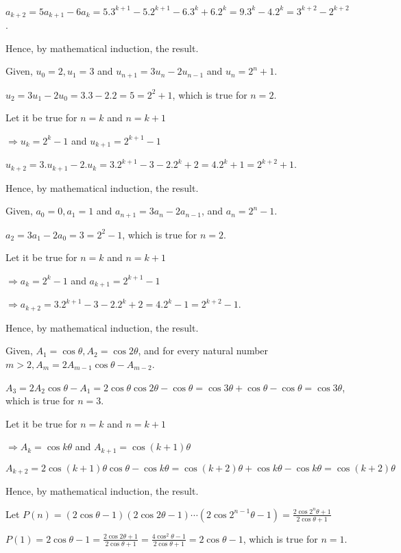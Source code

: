  $a_{k + 2} = 5a_{k + 1} - 6a_k = 5.3^{k + 1} - 5.2^{k + 1} - 6.3^k + 6.2^k = 9.3^k - 4.2^k = 3^{k + 2} -
  2^{k + 2}$.

  Hence, by mathematical induction, the result.
\item Given, $u_0 = 2, u_1 = 3$ and $u_{n + 1} = 3u_n - 2u_{n - 1}$ and $u_n = 2^n + 1$.

  $u_2 = 3u_1 - 2u_0 = 3.3 - 2.2 = 5 = 2^2 + 1$, which is true for $n = 2$.

  Let it be true for $n = k$ and $n = k + 1$

  $\Rightarrow u_k = 2^k - 1$ and $u_{k + 1} = 2^{k + 1} - 1$

  $u_{k + 2} = 3.u_{k + 1} - 2.u_k = 3.2^{k + 1} - 3 - 2.2^k + 2 = 4.2^k + 1 = 2^{k + 2} + 1$.

  Hence, by mathematical induction, the result.
\item Given, $a_0 = 0, a_1 = 1$ and $a_{n + 1} = 3a_n - 2a_{n - 1}$, and $a_n = 2^n - 1$.

  $a_2 = 3a_1 - 2a_0 = 3 = 2^2 - 1$, which is true for $n = 2$.

  Let it be true for $n = k$ and $n = k + 1$

  $\Rightarrow a_k = 2^k - 1$ and $a_{k + 1} = 2^{k + 1} - 1$

  $\Rightarrow a_{k + 2} = 3.2^{k + 1} - 3 - 2.2^k + 2 = 4.2^k - 1 = 2^{k + 2} - 1$.

  Hence, by mathematical induction, the result.
\item Given, $A_1 = \cos\theta, A_2 = \cos2\theta$, and for every natural number $m > 2, A_m =
  2A_{m-1}\cos\theta - A_{m - 2}$.

  $A_3 = 2A_2\cos\theta - A_1 = 2\cos\theta\cos2\theta - \cos\theta = \cos3\theta + \cos\theta - \cos\theta
  = \cos3\theta$, which is true for $n = 3$.

  Let it be true for $n = k$ and $n = k + 1$

  $\Rightarrow A_k = \cos k\theta$ and $A_{k +1} = \cos(k + 1)\theta$

  $A_{k + 2} = 2\cos(k + 1)\theta\cos\theta - \cos k\theta = \cos(k + 2)\theta + \cos k\theta - \cos k\theta
  = \cos(k + 2)\theta$

  Hence, by mathematical induction, the result.
\item Let $P(n) = (2\cos\theta - 1)(2\cos2\theta - 1)\cdots(2\cos2^{n - 1}\theta - 1) =
  \frac{2\cos2^n\theta + 1}{2\cos\theta + 1}$

  $P(1) = 2\cos\theta - 1 = \frac{2\cos2\theta + 1}{2\cos\theta + 1} = \frac{4\cos^2\theta - 1}{2\cos\theta
    + 1} = 2\cos\theta - 1$, which is true for $n = 1$.

